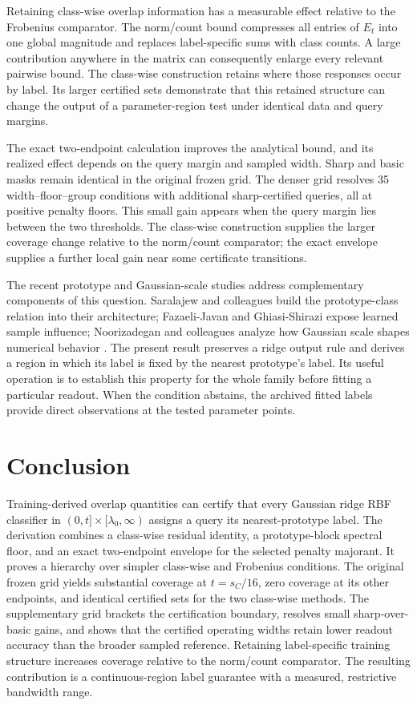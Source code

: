 \documentclass[preprint,12pt]{elsarticle}
\begin{document}
Retaining class-wise overlap information has a measurable effect relative to the Frobenius comparator. The norm/count bound compresses all entries of $E_t$ into one global magnitude and replaces label-specific sums with class counts. A large contribution anywhere in the matrix can consequently enlarge every relevant pairwise bound. The class-wise construction retains where those responses occur by label. Its larger certified sets demonstrate that this retained structure can change the output of a parameter-region test under identical data and query margins.

The exact two-endpoint calculation improves the analytical bound, and its realized effect depends on the query margin and sampled width. Sharp and basic masks remain identical in the original frozen grid. The denser grid resolves 35 width--floor--group conditions with additional sharp-certified queries, all at positive penalty floors. This small gain appears when the query margin lies between the two thresholds. The class-wise construction supplies the larger coverage change relative to the norm/count comparator; the exact envelope supplies a further local gain near some certificate transitions.

The recent prototype and Gaussian-scale studies address complementary components of this question. Saralajew and colleagues build the prototype-class relation into their architecture; Fazaeli-Javan and Ghiasi-Shirazi expose learned sample influence; Noorizadegan and colleagues analyze how Gaussian scale shapes numerical behavior \citep{saralajew2025,fazaeli2026,noorizadegan2026reliable,noorizadegan2026partition}. The present result preserves a ridge output rule and derives a region in which its label is fixed by the nearest prototype's label. Its useful operation is to establish this property for the whole family before fitting a particular readout. When the condition abstains, the archived fitted labels provide direct observations at the tested parameter points.

\section{Conclusion}
Training-derived overlap quantities can certify that every Gaussian ridge RBF classifier in $(0,t]\times[\lambda_0,\infty)$ assigns a query its nearest-prototype label. The derivation combines a class-wise residual identity, a prototype-block spectral floor, and an exact two-endpoint envelope for the selected penalty majorant. It proves a hierarchy over simpler class-wise and Frobenius conditions. The original frozen grid yields substantial coverage at $t=s_C/16$, zero coverage at its other endpoints, and identical certified sets for the two class-wise methods. The supplementary grid brackets the certification boundary, resolves small sharp-over-basic gains, and shows that the certified operating widths retain lower readout accuracy than the broader sampled reference. Retaining label-specific training structure increases coverage relative to the norm/count comparator. The resulting contribution is a continuous-region label guarantee with a measured, restrictive bandwidth range.
\end{document}
